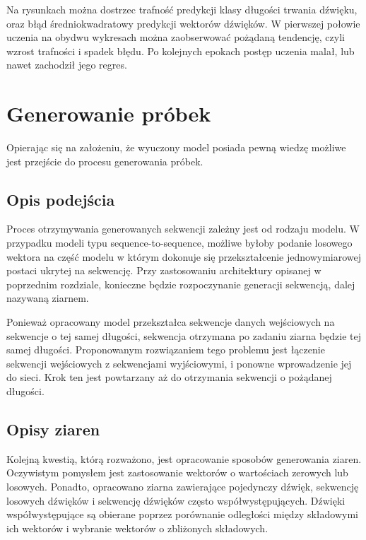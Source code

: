 {{        

        

        Na rysunkach można dostrzec trafność predykcji klasy długości trwania dźwięku, oraz błąd średniokwadratowy
        predykcji wektorów dźwięków. W pierwszej połowie uczenia na obydwu wykresach można zaobserwować pożądaną tendencję,
        czyli wzrost trafności i spadek błędu. Po kolejnych epokach postęp uczenia malał, lub nawet zachodził jego regres.
    }

    \section{Generowanie próbek}
    {
        Opierając się na założeniu, że wyuczony model posiada pewną wiedzę możliwe jest przejście do procesu generowania próbek.

        \subsection{Opis podejścia}\label{sec:gen_method}
        {
            Proces otrzymywania generowanych sekwencji zależny jest od rodzaju modelu.
            W przypadku modeli typu sequence-to-sequence, możliwe byłoby podanie losowego 
            wektora na część modelu w którym dokonuje się przekształcenie jednowymiarowej postaci ukrytej na sekwencję.
            Przy zastosowaniu architektury opisanej w poprzednim rozdziale, konieczne będzie 
            rozpoczynanie generacji sekwencją, dalej nazywaną ziarnem. 

            Ponieważ opracowany model przekształca sekwencje danych wejściowych na sekwencje
            o tej samej długości, sekwencja otrzymana po zadaniu ziarna będzie tej samej długości.
            Proponowanym rozwiązaniem tego problemu jest łączenie sekwencji wejściowych z sekwencjami wyjściowymi,
            i ponowne wprowadzenie jej do sieci. Krok ten jest powtarzany aż do otrzymania sekwencji o pożądanej długości.
        }

        \subsection{Opisy ziaren}
        {
            Kolejną kwestią, którą rozważono, jest opracowanie sposobów generowania ziaren.
            Oczywistym pomysłem jest zastosowanie wektorów o wartościach zerowych lub losowych.
            Ponadto, opracowano ziarna zawierające pojedynczy dźwięk, sekwencję losowych dźwięków
            i sekwencję dźwięków często współwystępujących. Dźwięki współwystępujące są obierane poprzez
            porównanie odległości między składowymi ich wektorów i wybranie wektorów o zbliżonych składowych.
        }
    }
}
